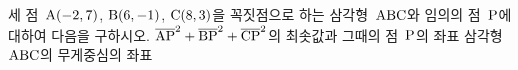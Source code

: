 세 점~$\mathrm{A}(-2{,}\mkern3mu\mathopen{}7)$, $\mathrm{B}(6{,}\mkern3mu\mathopen{}-1)$, $\mathrm{C}(8{,}\mkern3mu\mathopen{}3)$을 꼭짓점으로 하는 삼각형~$\mathrm{ABC}$와 임의의 점~$\mathrm{P}$에 대하여 다음을 구하시오.
 $\overline{\mathrm{AP}}^2+\overline{\mathrm{BP}}^2+\overline{\mathrm{CP}}^2$의 최솟값과 그때의 점~$\mathrm{P}$의 좌표
 삼각형~$\mathrm{ABC}$의 무게중심의 좌표
